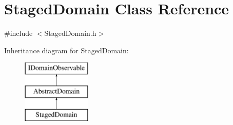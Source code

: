 \hypertarget{class_staged_domain}{}\section{Staged\+Domain Class Reference}
\label{class_staged_domain}


{\ttfamily \#include $<$Staged\+Domain.\+h$>$}

Inheritance diagram for Staged\+Domain\+:\begin{figure}[H]
\begin{center}
\leavevmode
\includegraphics[height=3.000000cm]{d2/d7b/class_staged_domain}
\end{center}
\end{figure}
